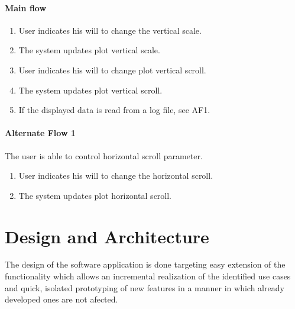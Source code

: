 			\paragraph{Main flow}
				\begin{enumerate}
				\item User indicates his will to change the vertical scale.
				\item The system updates plot vertical scale.
				\item User indicates his will to change plot vertical scroll.
				\item The system updates plot vertical scroll.
				\item If the displayed data is read from a log file, see AF1.
				\end{enumerate}
			
			\paragraph{Alternate Flow 1} The user is able to control horizontal scroll parameter.	
				\begin{enumerate}
				\item User indicates his will to change the horizontal scroll.
				\item The system updates plot horizontal scroll.
				\end{enumerate}

	\section{Design and Architecture}
	\label{sec:sw-arch}
	

		The design of the software application is done targeting easy extension of the functionality which allows an incremental realization of the identified use cases and quick, isolated prototyping of new features in a manner in which already developed ones are not afected.\\

